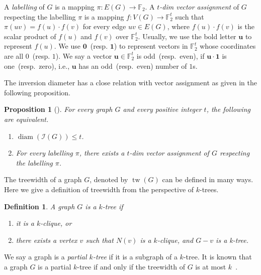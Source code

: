 \documentclass[
final
]{dmtcs-episciences}
\DeclareMathOperator{\tw}{\mathrm{tw}}
\DeclareMathOperator{\diam}{\mathrm{diam}}
\newtheorem{definition}[theorem]{Definition}
\newtheorem{proposition}[theorem]{Proposition}
\begin{document}
A \emph{labelling} of $G$ is a mapping $\pi: E(G) \rightarrow \mathbb{F}_2$.
A \emph{$t$-dim vector assignment} of $G$ respecting the labelling $\pi$ is a mapping $f: V(G) \rightarrow \mathbb{F}_2^t$ such that $\pi(uv) = f(u) \cdot f(v)$ for every edge $ uv \in E(G)$, where
\(f(u) \cdot f(v)\) is the scalar product of \(f(u)\) and \(f(v)\) over \(\mathbb{F}_2^t\).
Usually, we use the bold letter $\mathbf{u}$ to represent $f(u)$.
We use $\mathbf{0}$~(resp. $\mathbf{1}$) to represent vectors in $\mathbb{F}_2^t$ whose coordinates are all $0$~(resp. $1$).
We say a vector $\mathbf{u} \in \mathbb{F}_2^t$ is odd~(resp.~even), if $\mathbf{u \cdot 1} $ is one~(resp.~zero), i.e., $\mathbf{u}$ has an odd~(resp.~even) number of $1$s.

The inversion diameter has a close relation with vector assignment as given in the following proposition.

\begin{proposition}[\cite{havet2024diameter}]\label{prop: diam vector}
For every graph $G$ and every positive integer $t$, the following are equivalent.
\begin{enumerate}
    \item $\diam(\mathcal{I}(G)) \le t$.
    \item For every labelling $\pi$, there exists a $t$-dim vector assignment of $G$ respecting the labelling $\pi$.
\end{enumerate}
\end{proposition}

The treewidth of a graph $G$, denoted by $\tw(G)$ can be defined in many ways.
Here we give a definition of treewidth from the perspective of $k$-trees.

\begin{definition}\label{def: k tree}
A graph $G$ is a \emph{$k$-tree} if
\begin{enumerate}
    \item it is a $k$-clique, or
    \item there exists a vertex $v$ such that $N(v)$ is a $k$-clique, and $G-v$ is a k-tree.
\end{enumerate}
\end{definition}

We say a graph is a \emph{partial $k$-tree} if it is a subgraph of a $k$-tree.
It is known that a graph $G$ is a partial $k$-tree if and only if the treewidth of $G$ is at most $k$~\cite{scheffler1989baumweite, van1990graph}.
\end{document}
